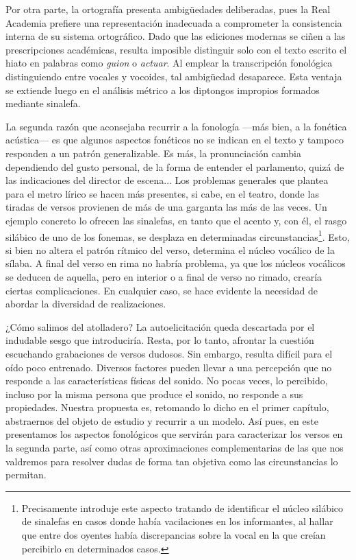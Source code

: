 Por otra parte, la ortografía presenta ambigüedades deliberadas, pues la Real Academia prefiere una representación inadecuada a comprometer la consistencia interna de su sistema ortográfico. Dado que las ediciones modernas se ciñen a las prescripciones académicas, resulta imposible distinguir solo con el texto escrito el hiato en palabras como \textit{guion} o \textit{actuar}. Al emplear la transcripción fonológica distinguiendo entre vocales y vocoides, tal ambigüedad desaparece. Esta ventaja se extiende luego en el análisis métrico a los diptongos impropios formados mediante sinalefa.

La segunda razón que aconsejaba recurrir a la fonología —más bien, a la fonética acústica— es que algunos aspectos fonéticos no se indican en el texto y tampoco responden a un patrón generalizable. Es más, la pronunciación cambia dependiendo del gusto personal, de la forma de entender el parlamento, quizá de las indicaciones del director de escena... Los problemas generales que plantea \citeauthor{sanchez2017}~\parencite*[12]{sanchez2017} para el metro lírico se hacen más presentes, si cabe, en el teatro, donde las tiradas de versos provienen de más de una garganta las más de las veces. Un ejemplo concreto lo ofrecen las sinalefas, en tanto que el acento y, con él, el rasgo silábico de uno de los fonemas, se desplaza en determinadas circunstancias\footnote{Precisamente introduje este aspecto tratando de identificar el núcleo silábico de sinalefas en casos donde había vacilaciones en los informantes, al hallar que entre dos oyentes había discrepancias sobre la vocal en la que creían percibirlo en determinados casos.}. Esto, si bien no altera el patrón rítmico del verso, determina el núcleo vocálico de la sílaba. A final del verso en rima no habría problema, ya que los núcleos vocálicos se deducen de aquella, pero en interior o a final de verso no rimado, crearía ciertas complicaciones. En cualquier caso, se hace evidente la necesidad de abordar la diversidad de realizaciones.

¿Cómo salimos del atolladero? La autoelicitación queda descartada por el indudable sesgo que introduciría. Resta, por lo tanto, afrontar la cuestión escuchando grabaciones de versos dudosos. Sin embargo, resulta difícil para el oído poco entrenado. Diversos factores pueden llevar a una percepción que no responde a las características físicas del sonido. No pocas veces, lo percibido, incluso por la misma persona que produce el sonido, no responde a sus propiedades. Nuestra propuesta es, retomando lo dicho en el primer capítulo, abstraernos del objeto de estudio y recurrir a un modelo. Así pues, en este presentamos los aspectos fonológicos que servirán para caracterizar los versos en la segunda parte, así como otras aproximaciones complementarias de las que nos valdremos para resolver dudas de forma tan objetiva como las circunstancias lo permitan.

